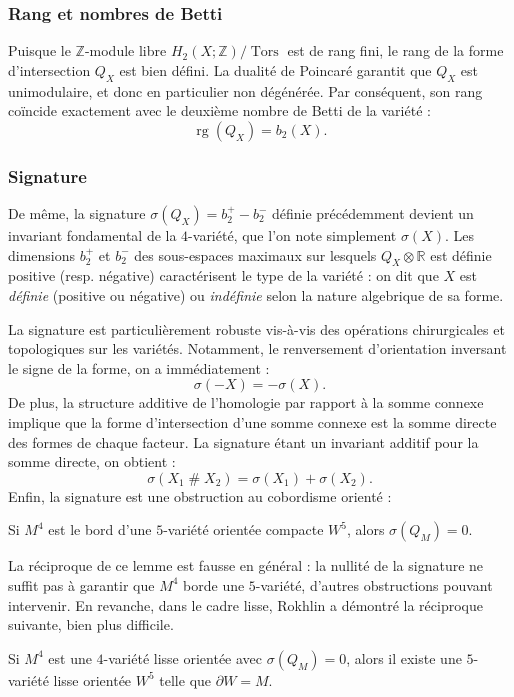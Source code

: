 \subsubsection{Rang et nombres de Betti}

Puisque le $\mathbb{Z}$-module libre $H_2(X;\mathbb{Z}) / \operatorname{Tors}$ est de rang fini, le rang de la forme d'intersection $Q_X$ est bien défini. La dualité de Poincaré garantit que $Q_X$ est unimodulaire, et donc en particulier non dégénérée. Par conséquent, son rang coïncide exactement avec le deuxième nombre de Betti de la variété :
\[
\operatorname{rg}(Q_X) = b_2(X).
\]

\subsubsection{Signature}

De même, la signature $\sigma(Q_X) = b_2^+ - b_2^-$ définie précédemment devient un invariant fondamental de la $4$-variété, que l'on note simplement $\sigma(X)$. Les dimensions $b_2^+$ et $b_2^-$ des sous-espaces maximaux sur lesquels $Q_X \otimes \mathbb{R}$ est définie positive (resp. négative) caractérisent le type de la variété : on dit que $X$ est \emph{définie} (positive ou négative) ou \emph{indéfinie} selon la nature algebrique de sa forme.

La signature est particulièrement robuste vis-à-vis des opérations chirurgicales et topologiques sur les variétés. Notamment, le renversement d'orientation inversant le signe de la forme, on a immédiatement :
\[
\sigma(-X) = -\sigma(X).
\]
De plus, la structure additive de l'homologie par rapport à la somme connexe implique que la forme d'intersection d'une somme connexe est la somme directe des formes de chaque facteur. La signature étant un invariant additif pour la somme directe, on obtient :
\[
\sigma(X_1 \mathbin{\#} X_2) = \sigma(X_1) + \sigma(X_2).
\]
Enfin, la signature est une obstruction au cobordisme orienté :

\begin{lemma}
Si $M^4$ est le bord d'une $5$-variété orientée compacte $W^5$, alors $\sigma(Q_M) = 0$.
\end{lemma}

La réciproque de ce lemme est fausse en général : la nullité de la signature ne suffit pas à garantir que $M^4$ borde une $5$-variété, d'autres obstructions pouvant intervenir. En revanche, dans le cadre lisse, Rokhlin a démontré la réciproque suivante, bien plus difficile.

\begin{theorem}[Rokhlin]
Si $M^4$ est une $4$-variété lisse orientée avec $\sigma(Q_M) = 0$, alors il existe une $5$-variété lisse orientée $W^5$ telle que $\partial W = M$.
\end{theorem}
\newpage


